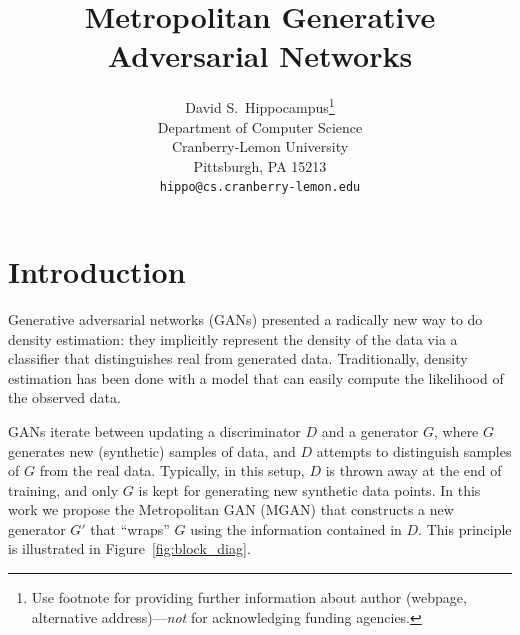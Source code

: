 \documentclass{article}
\title{Metropolitan Generative Adversarial Networks}
\author{
  David S.~Hippocampus\thanks{Use footnote for providing further
    information about author (webpage, alternative
    address)---\emph{not} for acknowledging funding agencies.} \\
  Department of Computer Science\\
  Cranberry-Lemon University\\
  Pittsburgh, PA 15213 \\
  \texttt{hippo@cs.cranberry-lemon.edu} \\
}
\begin{document}

\maketitle


\section{Introduction}

Generative adversarial networks (GANs) presented a radically new way to do density estimation:
they implicitly represent the density of the data via a classifier that distinguishes real from generated data.
Traditionally, density estimation has been done with a model that can easily compute the likelihood of the observed data.

GANs iterate between updating a discriminator $D$ and a generator $G$, where $G$ generates new (synthetic) samples of data, and $D$ attempts to distinguish samples of $G$ from the real data.
Typically, in this setup, $D$ is thrown away at the end of training, and only $G$ is kept for generating new synthetic data points.
In this work we propose the Metropolitan GAN (MGAN) that constructs a new generator $G'$ that ``wraps'' $G$ using the information contained in $D$.
This principle is illustrated in Figure~\ref{fig:block_diag}.
\end{document}
